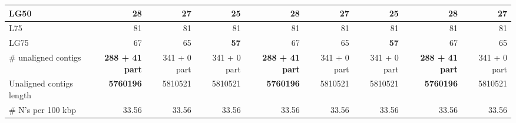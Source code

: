 \documentclass[12pt,a4paper]{article}
\begin{document}
\begin{table}[ht]
\begin{center}
\begin{tabular}{|l*{8}{|r}|}
LG50 & 28 & 27 & {\bf 25} & 28 & 27 & {\bf 25} & 28 & 27 \\ \hline
L75 & 81 & 81 & 81 & 81 & 81 & 81 & 81 & 81 \\ \hline
LG75 & 67 & 65 & {\bf 57} & 67 & 65 & {\bf 57} & 67 & 65 \\ \hline
\# unaligned contigs & {\bf 288 + 41 part} & 341 + 0 part & 341 + 0 part & {\bf 288 + 41 part} & 341 + 0 part & 341 + 0 part & {\bf 288 + 41 part} & 341 + 0 part \\ \hline
Unaligned contigs length & {\bf 5760196} & 5810521 & 5810521 & {\bf 5760196} & 5810521 & 5810521 & {\bf 5760196} & 5810521 \\ \hline
\# N's per 100 kbp & 33.56 & 33.56 & 33.56 & 33.56 & 33.56 & 33.56 & 33.56 & 33.56 \\ \hline
\end{tabular}
\end{center}
\end{table}
\end{document}
